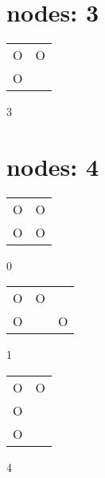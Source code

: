 \centering
\section{nodes: 3}
\begin{tabular}{|m{0.2cm}m{0.2cm}|}\hline
O&O\\
O& \\
\hline\end{tabular}3
\section{nodes: 4}
\begin{tabular}{|m{0.2cm}m{0.2cm}|}\hline
O&O\\
O&O\\
\hline\end{tabular}0
\begin{tabular}{|m{0.2cm}m{0.2cm}m{0.2cm}|}\hline
O&O& \\
O& &O\\
\hline\end{tabular}1
\begin{tabular}{|m{0.2cm}m{0.2cm}|}\hline
O&O\\
O& \\
O& \\
\hline\end{tabular}4
